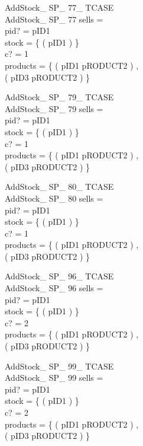 \documentclass[fleqn,colorlinks,linkcolor=blue,citecolor=blue,urlcolor=blue]{article}
\newcommand{\negate}[0]{-}
\begin{document}
\begin{multicols}{2}
\begin{schema}{AddStock\_ SP\_ 77\_ TCASE}\\
 AddStock\_ SP\_ 77
\where
 sells =~\emptyset \\
 pid? = pID1 \\
 stock = \{ ( pID1  ) \} \\
 c? = 1 \\
 products = \{ ( pID1 \mapsto pRODUCT2 ) , \\ ( pID3 \mapsto pRODUCT2 ) \}
\end{schema}


\begin{schema}{AddStock\_ SP\_ 79\_ TCASE}\\
 AddStock\_ SP\_ 79
\where
 sells =~\emptyset \\
 pid? = pID1 \\
 stock = \{ ( pID1  ) \} \\
 c? = 1 \\
 products = \{ ( pID1 \mapsto pRODUCT2 ) , \\ ( pID3 \mapsto pRODUCT2 ) \}
\end{schema}


\begin{schema}{AddStock\_ SP\_ 80\_ TCASE}\\
 AddStock\_ SP\_ 80
\where
 sells =~\emptyset \\
 pid? = pID1 \\
 stock = \{ ( pID1  ) \} \\
 c? = 1 \\
 products = \{ ( pID1 \mapsto pRODUCT2 ) , \\ ( pID3 \mapsto pRODUCT2 ) \}
\end{schema}


\begin{schema}{AddStock\_ SP\_ 96\_ TCASE}\\
 AddStock\_ SP\_ 96
\where
 sells =~\emptyset \\
 pid? = pID1 \\
 stock = \{ ( pID1 \mapsto \negate 4294967296 ) \} \\
 c? = 2 \\
 products = \{ ( pID1 \mapsto pRODUCT2 ) , \\ ( pID3 \mapsto pRODUCT2 ) \}
\end{schema}


\begin{schema}{AddStock\_ SP\_ 99\_ TCASE}\\
 AddStock\_ SP\_ 99
\where
 sells =~\emptyset \\
 pid? = pID1 \\
 stock = \{ ( pID1  ) \} \\
 c? = 2 \\
 products = \{ ( pID1 \mapsto pRODUCT2 ) , \\  ( pID3 \mapsto pRODUCT2 ) \}
\end{schema}



\end{multicols}
\end{document}
